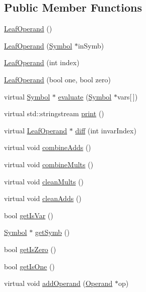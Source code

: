 \subsection*{Public Member Functions}
\begin{DoxyCompactItemize}
\item 
\hyperlink{class_leaf_operand_a82c9cefd1d49381d53b6ea4cf65c314f}{Leaf\+Operand} ()
\item 
\hyperlink{class_leaf_operand_adbe93a55f8afd71db31b6038ef68f6ae}{Leaf\+Operand} (\hyperlink{class_symbol}{Symbol} $\ast$in\+Symb)
\item 
\hyperlink{class_leaf_operand_a6d0a1222d321a82b8b2322e78165c4ba}{Leaf\+Operand} (int index)
\item 
\hyperlink{class_leaf_operand_a33d6c50fa7164efba0bc8aa1b57bf1a0}{Leaf\+Operand} (bool one, bool zero)
\item 
virtual \hyperlink{class_symbol}{Symbol} $\ast$ \hyperlink{class_leaf_operand_ae42e6497dac355f12624a718d6f91a33}{evaluate} (\hyperlink{class_symbol}{Symbol} $\ast$vars\mbox{[}$\,$\mbox{]})
\item 
virtual std\+::stringstream \hyperlink{class_leaf_operand_a3fd735b5d259ad12676f01e84407e0da}{print} ()
\item 
virtual \hyperlink{class_leaf_operand}{Leaf\+Operand} $\ast$ \hyperlink{class_leaf_operand_ada3d818eb13fe43a9117b6140a66072f}{diff} (int invar\+Index)
\item 
virtual void \hyperlink{class_leaf_operand_ae0702803af7b67cf3d1f2da7d27c4698}{combine\+Adds} ()
\item 
virtual void \hyperlink{class_leaf_operand_a11f84bc19234ece8291aaba171692bb8}{combine\+Mults} ()
\item 
virtual void \hyperlink{class_leaf_operand_af5c807f1f53e279f63bd89b89e20272e}{clean\+Mults} ()
\item 
virtual void \hyperlink{class_leaf_operand_ac1f316659c696c5c09fc58a9f02ccc53}{clean\+Adds} ()
\item 
bool \hyperlink{class_leaf_operand_a3674169dd74d3f9f408163f4a796950a}{get\+Is\+Var} ()
\item 
\hyperlink{class_symbol}{Symbol} $\ast$ \hyperlink{class_leaf_operand_aa777cbbfef3b5fcd24622692d7d1821f}{get\+Symb} ()
\item 
bool \hyperlink{class_leaf_operand_aa2b82625a6291864d4afb6f5a1adea15}{get\+Is\+Zero} ()
\item 
bool \hyperlink{class_leaf_operand_a5bc1ec7ac9dbd5f77d598213706fe8e7}{get\+Is\+One} ()
\item 
virtual void \hyperlink{class_leaf_operand_a10d0959f23294fd4929d0b7551168f5c}{add\+Operand} (\hyperlink{class_operand}{Operand} $\ast$op)
\end{DoxyCompactItemize}
